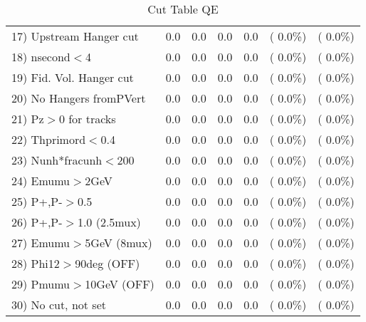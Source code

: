 \begin{table}[h!]
\begin{tabular}{||l||r|r|r|r|r|r||}
 17) Upstream Hanger cut  &          0.0 &          0.0 &          0.0 &          0.0 & (  0.0\%) & (  0.0\%) \\
 18) nsecond$<$4          &          0.0 &          0.0 &          0.0 &          0.0 & (  0.0\%) & (  0.0\%) \\
 19) Fid. Vol. Hanger cut &          0.0 &          0.0 &          0.0 &          0.0 & (  0.0\%) & (  0.0\%) \\
 20) No Hangers fromPVert &          0.0 &          0.0 &          0.0 &          0.0 & (  0.0\%) & (  0.0\%) \\
 21) Pz$>$0 for tracks    &          0.0 &          0.0 &          0.0 &          0.0 & (  0.0\%) & (  0.0\%) \\
 22) Thprimord$<$0.4      &          0.0 &          0.0 &          0.0 &          0.0 & (  0.0\%) & (  0.0\%) \\
 23) Nunh*fracunh$<$200   &          0.0 &          0.0 &          0.0 &          0.0 & (  0.0\%) & (  0.0\%) \\
 24) Emumu$>$2GeV         &          0.0 &          0.0 &          0.0 &          0.0 & (  0.0\%) & (  0.0\%) \\
 25) P+,P-$>$0.5          &          0.0 &          0.0 &          0.0 &          0.0 & (  0.0\%) & (  0.0\%) \\
 26) P+,P-$>$1.0 (2.5mux) &          0.0 &          0.0 &          0.0 &          0.0 & (  0.0\%) & (  0.0\%) \\
 27) Emumu$>$5GeV  (8mux) &          0.0 &          0.0 &          0.0 &          0.0 & (  0.0\%) & (  0.0\%) \\
 28) Phi12$>$90deg  (OFF) &          0.0 &          0.0 &          0.0 &          0.0 & (  0.0\%) & (  0.0\%) \\
 29) Pmumu$>$10GeV  (OFF) &          0.0 &          0.0 &          0.0 &          0.0 & (  0.0\%) & (  0.0\%) \\
 30) No cut, not set      &          0.0 &          0.0 &          0.0 &          0.0 & (  0.0\%) & (  0.0\%) \\
 \hline
 \hline
 \end{tabular}
 \caption{Cut Table  QE       }
 \label{tab-cutheavy_neutrino_0.250}
 \end{table}
